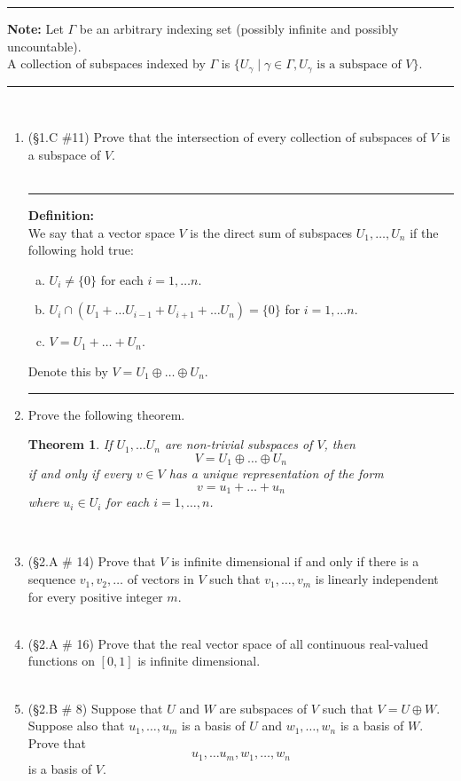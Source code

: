 \documentclass[12pt,letterpaper]{article}
\theoremstyle{plain}
\newtheorem{theorem}{Theorem}[section]
\theoremstyle{definition}
\begin{document}
\hrule
\vspace{.1in}
 {\bf Note:} Let $\Gamma$ be an arbitrary indexing set (possibly infinite and possibly uncountable).\\ \indent A collection of subspaces indexed by $\Gamma$ is $\{U_\gamma \mid \gamma\in \Gamma, U_\gamma\text{ is a subspace of } V\}$.\\
\hrule
\ \\
\begin{enumerate}[1.]
\item (\S 1.C \#11) Prove that the intersection of every collection of subspaces of $V$ is a subspace of $V$. \\
\ \\
\hrule 
{\bf Definition:}\vspace{.1in}\\
We say that a vector space $V$ is the direct sum of subspaces $U_1, \ldots ,U_n$ if the following hold true:
\begin{enumerate}[(a)]
\item $U_i\neq \{0\}$ for each $i=1, \ldots n$. 
\item $U_i\cap (U_1+\ldots U_{i-1}+U_{i+1}+\ldots U_n)=\{0\}$ for $i=1,\ldots n$. 
\item $V=U_1+\ldots +U_n$. 
\end{enumerate}
Denote this by $V=U_1\oplus\ldots \oplus U_n$. \\

\hrule
\item Prove the following theorem. \\
\begin{theorem} If $U_1, \ldots U_n$ are non-trivial subspaces of $V$, then 
\[V=U_1\oplus \ldots \oplus U_n\] if and only if every $v\in V$ has a unique representation of the form 
\[v=u_1+\ldots +u_n\] 
where $u_i\in U_i$ for each $i=1,\ldots, n$. 
\end{theorem}
\ \\
\item (\S 2.A \# 14) Prove that $V$ is infinite dimensional if and only if there is a sequence $v_1, v_2, \ldots $ of vectors in $V$ such that $v_1, \ldots ,v_m$ is linearly independent for every positive integer $m$. \\
\ \\
\item (\S 2.A \# 16) Prove that the real vector space of all continuous real-valued functions on $[0,1]$ is infinite dimensional. \\
\ \\
\item (\S 2.B \# 8) Suppose that $U$ and $W$ are subspaces of $V$ such that $V=U\oplus W$. Suppose also that $u_1, \ldots ,u_m$ is a basis of $U$ and $w_1, \ldots , w_n$ is a basis of $W$. Prove that 
\[u_1, \ldots u_m, w_1, \ldots, w_n\]
is a basis of $V$. 
\end{enumerate}
\end{document}

